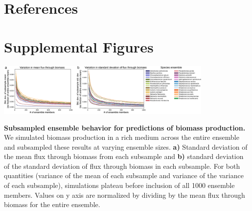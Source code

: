 \documentclass[11pt,twocolumn,notitlepage,openany,twoside]{book}
\begin{document}
\begin{refsection}
\section{References}

\printbibliography[heading=none]

\section{Supplemental Figures}

\begin{suppfigure*}
\centering
\includegraphics[width=0.8\textwidth]{ch3_figS1}
\caption[ Subsampled ensemble behavior for predictions of biomass production.]{\textbf{ Subsampled ensemble behavior for predictions of biomass production.} We simulated biomass production in a rich medium across the entire ensemble and subsampled these results at varying ensemble sizes. \textbf{a)} Standard deviation of the mean flux through biomass from each subsample and \textbf{b)} standard deviation of the standard deviation of flux through biomass in each subsample. For both quantities (variance of the mean of each subsample and variance of the variance of each subsample), simulations plateau before inclusion of all 1000 ensemble members. Values on y axis are normalized by dividing by the mean flux through biomass for the entire ensemble.}
\end{suppfigure*}

\end{refsection}

\end{document}
